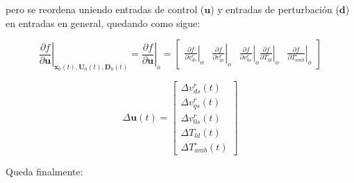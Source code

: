 \documentclass[blue,fullpaper]{ludusofficial}  %
\begin{document}
pero se reordena uniendo entradas de control (\(\mathbf{u}\)) y entradas de perturbación (\(\mathbf{d}\)) en entradas en general, quedando como sigue:

\[
\left. \frac{\partial f}{\partial \mathbf{u}} \right|_{\mathbf{x}_0(t), \mathbf{U}_0(t), \mathbf{D}_0(t)} = \left. \frac{\partial f}{\partial \mathbf{u}} \right|_o = \begin{bmatrix} \left. \frac{\partial f}{\partial v_{ds}^{r}} \right|_o & \left. \frac{\partial f}{\partial v_{qs}^{r}} \right|_o & \left. \frac{\partial f}{\partial v_{0s}^{r}} \right|_o \left.  \frac{\partial f}{\partial T_{ld}} \right|_o & \left. \frac{\partial f}{\partial T_{amb}^{\circ}} \right|_o \end{bmatrix}
\]

\[
\Delta \mathbf{u}(t)=\begin{bmatrix} \Delta v_{ds}^{r}(t) \\ \Delta v_{qs}^{r}(t) \\ \Delta v_{0s}^{r}(t) \\\Delta T_{ld}(t) \\ \Delta T_{amb}^{\circ}(t)\end{bmatrix}
\]

Queda finalmente:
\end{document}
